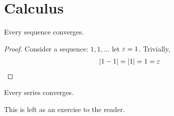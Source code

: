 \setcounter{section}{0}

\section{Calculus}

\begin{thm}
  Every sequence converges.
\end{thm}
\begin{proof}
  Consider a sequence: $1,1,\ldots$ let $\varepsilon=1$. Trivially,
  \begin{align*}
    |1-1| = |1| = 1 = \varepsilon
  \end{align*}
\end{proof}

\begin{cor}
  Every series converges.
\end{cor}
This is left as an exercise to the reader.
